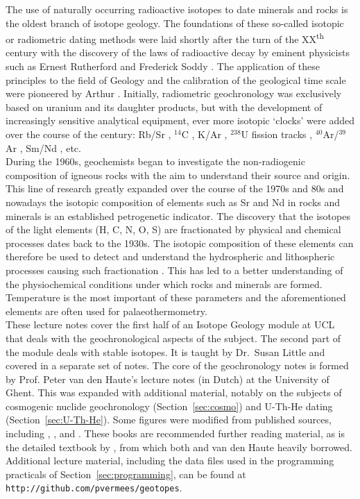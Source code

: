 \documentclass{book}
\begin{document}
The use of naturally occurring radioactive isotopes to date minerals
and rocks is the oldest branch of isotope geology. The foundations of
these so-called isotopic or radiometric dating methods were laid
shortly after the turn of the XX\textsuperscript{th} century with the
discovery of the laws of radioactive decay by eminent physicists such
as Ernest Rutherford and Frederick Soddy \citep{rutherford1902a,
  rutherford1902b}.  The application of these principles to the field
of Geology and the calibration of the geological time scale were
pioneered by Arthur \citet{holmes1911, holmes1913,
  holmes1947}. Initially, radiometric geochronology was exclusively
based on uranium and its daughter products, but with the development
of increasingly sensitive analytical equipment, ever more isotopic
`clocks' were added over the course of the century: Rb/Sr
\citep{hahn1943}, $^{14}$C \citep{libby1946}, K/Ar
\citep{aldrich1948}, $^{238}$U fission tracks \citep{price1963},
$^{40}$Ar/$^{39}$Ar \citep{merrihue1966}, Sm/Nd \citep{lugmair1974},
etc.\\

During the 1960s, geochemists began to investigate the non-radiogenic
composition of igneous rocks with the aim to understand their source
and origin. This line of research greatly expanded over the course of
the 1970s and 80s and nowadays the isotopic composition of elements
such as Sr and Nd in rocks and minerals is an established petrogenetic
indicator. The discovery that the isotopes of the light elements (H,
C, N, O, S) are fractionated by physical and chemical processes dates
back to the 1930s. The isotopic composition of these elements can
therefore be used to detect and understand the hydrospheric and
lithospheric processes causing such fractionation
\citep{urey1947}. This has led to a better understanding of the
physiochemical conditions under which rocks and minerals are
formed. Temperature is the most important of these parameters and the
aforementioned elements are often used for palaeothermometry.\\

These lecture notes cover the first half of an Isotope Geology module
at UCL that deals with the geochronological aspects of the subject.
The second part of the module deals with stable isotopes. It is taught
by Dr.~Susan Little and covered in a separate set of notes. The core
of the geochronology notes is formed by Prof. Peter van den Haute's
lecture notes (in Dutch) at the University of Ghent.  This was
expanded with additional material, notably on the subjects of
cosmogenic nuclide geochronology (Section~\ref{sec:cosmo}) and U-Th-He
dating (Section~\ref{sec:U-Th-He}). Some figures were modified from
published sources, including \citet{allegre2008}, \citet{braun2006},
and \citet{galbraith2005}. These books are recommended further reading
material, as is the detailed textbook by \citet{dickin2005}, from
which both \citet{allegre2008} and van den Haute heavily
borrowed. Additional lecture material, including the data files used
in the programming practicals of Section~\ref{sec:programming}, can be
found at \texttt{http://github.com/pvermees/geotopes}.
\end{document}
